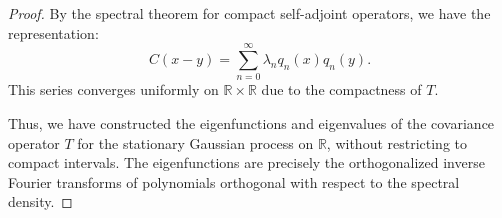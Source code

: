 \documentclass{article}
\begin{document}
\begin{proof}
By the spectral theorem for compact self-adjoint operators, we have the representation:
\[
C(x-y) = \sum_{n=0}^\infty \lambda_n q_n(x) q_n(y).
\]
This series converges uniformly on \( \mathbb{R} \times \mathbb{R} \) due to the compactness of \( T \).

Thus, we have constructed the eigenfunctions and eigenvalues of the covariance operator \( T \) for the stationary Gaussian process on \(\mathbb{R}\), without restricting to compact intervals. The eigenfunctions are precisely the orthogonalized inverse Fourier transforms of polynomials orthogonal with respect to the spectral density.
\end{proof}
\end{document}
